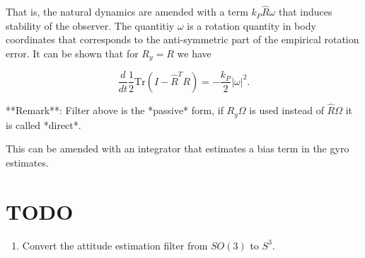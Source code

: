 That is, the natural dynamics are amended with a term $k_P \hat R \omega$ that induces stability of the observer. The quantitiy $\omega$ is a rotation quantity in body coordinates that corresponds to the anti-symmetric part of the empirical rotation error. It can be shown that for $R_y = R$ we have

$$
  \frac{d}{d t} \frac{1}{2} \text{Tr} \left( I - \hat R^T R \right) = -\frac{k_P}{2} |\omega|^2.
$$

**Remark**: Filter above is the *passive* form, if $R_y \Omega$ is used instead of $\hat R \Omega$ it is called *direct*.

This can be amended with an integrator that estimates a bias term in the gyro estimates.
\section{TODO}

\begin{enumerate}
  \item Convert the attitude estimation filter from $SO(3)$ to $S^3$.
\end{enumerate}
